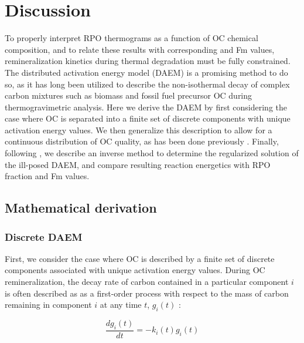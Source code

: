 \section{Discussion}

To properly interpret RPO thermograms as a function of OC chemical composition, and to relate these results with corresponding  and Fm values, remineralization kinetics during thermal degradation must be fully constrained. The distributed activation energy model (DAEM) is a promising method to do so, as it has long been utilized to describe the non-isothermal decay of complex carbon mixtures such as biomass \citep[\textit{e.g.}][]{Bradbury:1979to,White:2011iz} and fossil fuel precursor OC \citep[\textit{e.g.}][]{Burnham:1987ut,Braun:1987vf,Burnham:1999ec,Cramer:2004tg,Dieckmann:2005dw} during thermogravimetric analysis. Here we derive the DAEM  by first considering the case where OC is separated into a finite set of discrete components with unique activation energy values. We then generalize this description to allow for a continuous distribution of OC quality, as has been done previously \citep[see][for review]{Burnham:1999ec}. Finally, following \citet{Forney:2012dr,Forney:2012hz}, we describe an inverse method to determine the regularized solution of the ill-posed DAEM, and compare resulting reaction energetics with RPO fraction  and Fm values.

\subsection{Mathematical derivation}

\subsubsection{Discrete DAEM}

First, we consider the case where OC is described by a finite set of discrete components associated with unique activation energy values. During OC remineralization, the decay rate of carbon contained in a particular component $i$ is often described as as a first-order process with respect to the mass of carbon remaining in component $i$ at any time $t$, $g_{i}(t)$ \citep{Berner:1980ux,Braun:1987vf}:

\begin{equation}\label{Ch3Eq:1}
	\frac{dg_{i}(t)}{dt} = - k_{i}(t) g_{i}(t)
\end{equation}

